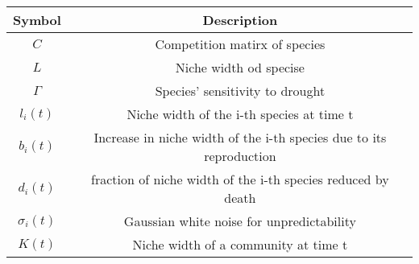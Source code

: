 \documentclass[12pt, a4paper, oneside]{ctexart}
\begin{document}
\begin{table}[]
    \begin{tabular}{cclll}
    \hline
    \textbf{Symbol}               & \multicolumn{4}{c}{\textbf{Description}}                                                \\ \hline
    $C$                           & \multicolumn{4}{c}{Competition matirx of species}                                       \\
    $L$                           & \multicolumn{4}{c}{Niche width od specise}                                              \\
    $\Gamma $                     & \multicolumn{4}{c}{Species’ sensitivity to drought}                                     \\
    ${l_i}\left( t \right)$       & \multicolumn{4}{c}{Niche width of the i-th species at time t}                           \\
    ${b_i}\left( t \right)$       & \multicolumn{4}{c}{Increase in niche width of the i-th species due to its reproduction} \\
    ${d_i}\left( t \right)$       & \multicolumn{4}{c}{fraction of niche width of the i-th species reduced by death}        \\
    ${\sigma _i}\left( t \right)$ & \multicolumn{4}{c}{Gaussian white noise for unpredictability}                           \\
    $K\left( t \right)$           & \multicolumn{4}{c}{Niche width of a community at time t}                                \\ \hline
    \end{tabular}
    \end{table}
\end{document}
